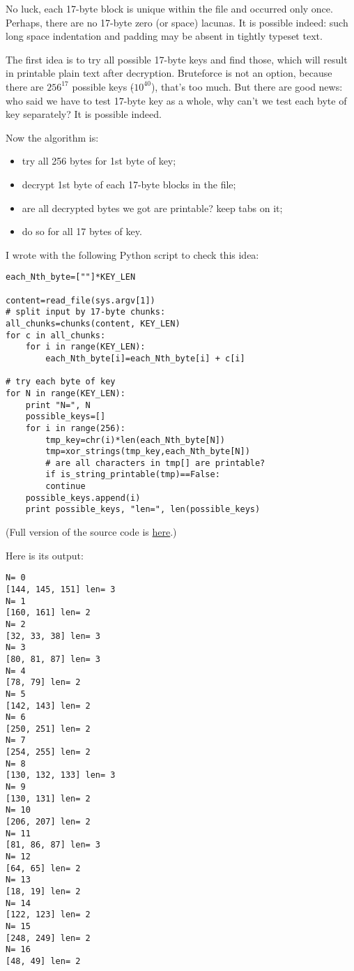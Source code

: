 No luck, each 17-byte block is unique within the file and occurred only once.
Perhaps, there are no 17-byte zero (or space) lacunas.
It is possible indeed: such long space indentation and padding may be absent in tightly typeset text.

The first idea is to try all possible 17-byte keys and find those, which will result in printable plain text after decryption.
Bruteforce is not an option, because there are $256^{17}$ possible keys ($\tilde{}10^{40}$), that's too much.
But there are good news: who said we have to test 17-byte key as a whole, why can't we test each byte of key separately?
It is possible indeed.

Now the algorithm is:

\begin{itemize}
\item try all 256 bytes for 1st byte of key;
\item decrypt 1st byte of each 17-byte blocks in the file;
\item are all decrypted bytes we got are printable? keep tabs on it;
\item do so for all 17 bytes of key.
\end{itemize}

I wrote with the following Python script to check this idea:

\begin{lstlisting}[caption=Python script,style=custompy]
each_Nth_byte=[""]*KEY_LEN

content=read_file(sys.argv[1])
# split input by 17-byte chunks:
all_chunks=chunks(content, KEY_LEN)
for c in all_chunks:
    for i in range(KEY_LEN):
        each_Nth_byte[i]=each_Nth_byte[i] + c[i]

# try each byte of key
for N in range(KEY_LEN):
    print "N=", N
    possible_keys=[]
    for i in range(256):
        tmp_key=chr(i)*len(each_Nth_byte[N])
        tmp=xor_strings(tmp_key,each_Nth_byte[N])
        # are all characters in tmp[] are printable?
        if is_string_printable(tmp)==False:
	    continue
	possible_keys.append(i)
    print possible_keys, "len=", len(possible_keys)
\end{lstlisting}

(Full version of the source code is \href{https://github.com/dennis714/RE-for-beginners/blob/master/ff/XOR/mask_2/files/decrypt2.py}{here}.)

Here is its output:

\begin{lstlisting}
N= 0
[144, 145, 151] len= 3
N= 1
[160, 161] len= 2
N= 2
[32, 33, 38] len= 3
N= 3
[80, 81, 87] len= 3
N= 4
[78, 79] len= 2
N= 5
[142, 143] len= 2
N= 6
[250, 251] len= 2
N= 7
[254, 255] len= 2
N= 8
[130, 132, 133] len= 3
N= 9
[130, 131] len= 2
N= 10
[206, 207] len= 2
N= 11
[81, 86, 87] len= 3
N= 12
[64, 65] len= 2
N= 13
[18, 19] len= 2
N= 14
[122, 123] len= 2
N= 15
[248, 249] len= 2
N= 16
[48, 49] len= 2
\end{lstlisting}

